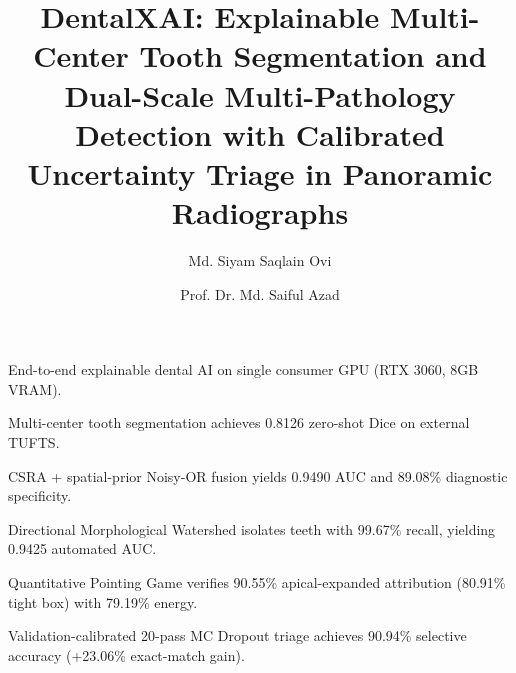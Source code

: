 \documentclass[review]{elsarticle}
\begin{document}
\begin{frontmatter}

\title{DentalXAI: Explainable Multi-Center Tooth Segmentation and Dual-Scale Multi-Pathology Detection with Calibrated Uncertainty Triage in Panoramic Radiographs}

\author[gub]{Md. Siyam Saqlain Ovi}
\author[gub]{Prof. Dr. Md. Saiful Azad}

\address[gub]{Department of Computer Science and Engineering, Green University of Bangladesh, Dhaka, 1207, Bangladesh}

\begin{highlights}
\item End-to-end explainable dental AI on single consumer GPU (RTX 3060, 8GB VRAM).
\item Multi-center tooth segmentation achieves 0.8126 zero-shot Dice on external TUFTS.
\item CSRA + spatial-prior Noisy-OR fusion yields 0.9490 AUC and 89.08\% diagnostic specificity.
\item Directional Morphological Watershed isolates teeth with 99.67\% recall, yielding 0.9425 automated AUC.
\item Quantitative Pointing Game verifies 90.55\% apical-expanded attribution (80.91\% tight box) with 79.19\% energy.
\item Validation-calibrated 20-pass MC Dropout triage achieves 90.94\% selective accuracy (+23.06\% exact-match gain).
\end{highlights}


\end{frontmatter}
\end{document}
